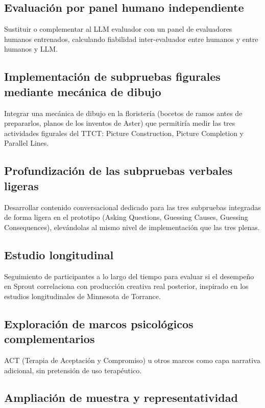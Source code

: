 \documentclass[12pt,twoside,titlepage]{report}
\begin{document}
\subsection{Evaluación por panel humano independiente}

Sustituir o complementar al LLM evaluador con un panel de evaluadores humanos entrenados, calculando fiabilidad inter-evaluador entre humanos y entre humanos y LLM.

\subsection{Implementación de subpruebas figurales mediante mecánica de dibujo}

Integrar una mecánica de dibujo en la floristería (bocetos de ramos antes de prepararlos, planos de los inventos de Aster) que permitiría medir las tres actividades figurales del TTCT: Picture Construction, Picture Completion y Parallel Lines.

\subsection{Profundización de las subpruebas verbales ligeras}

Desarrollar contenido conversacional dedicado para las tres subpruebas integradas de forma ligera en el prototipo (Asking Questions, Guessing Causes, Guessing Consequences), elevándolas al mismo nivel de implementación que las tres plenas.

\subsection{Estudio longitudinal}

Seguimiento de participantes a lo largo del tiempo para evaluar si el desempeño en Sprout correlaciona con producción creativa real posterior, inspirado en los estudios longitudinales de Minnesota de Torrance.

\subsection{Exploración de marcos psicológicos complementarios}

ACT (Terapia de Aceptación y Compromiso) u otros marcos como capa narrativa adicional, sin pretensión de uso terapéutico.

\subsection{Ampliación de muestra y representatividad}
\end{document}
